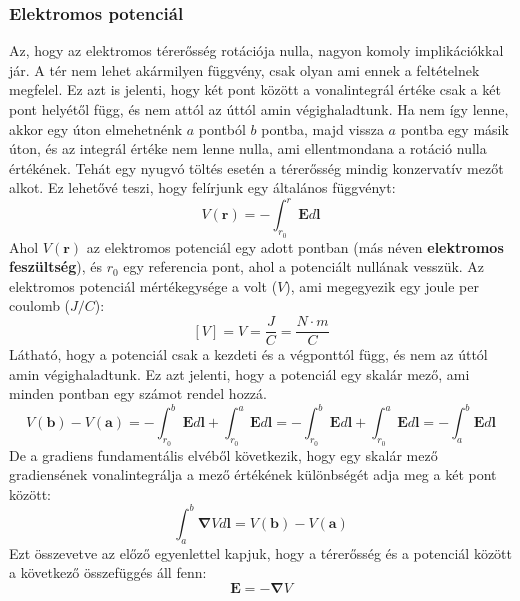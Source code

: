 \documentclass[../main.tex]{subfiles}
\begin{document}
\subsubsection{Elektromos potenciál}
Az, hogy az elektromos térerősség rotációja nulla, nagyon komoly implikációkkal jár. A tér nem lehet akármilyen függvény, csak olyan ami ennek a feltételnek megfelel.
Ez azt is jelenti, hogy két pont között a vonalintegrál értéke csak a két pont helyétől függ, és nem attól az úttól amin végighaladtunk. Ha nem így lenne, akkor egy úton elmehetnénk $a$ pontból $b$ pontba, majd vissza $a$ pontba egy másik úton, és az integrál értéke nem lenne nulla, ami ellentmondana a rotáció nulla értékének.
Tehát egy nyugvó töltés esetén a térerősség mindig konzervatív mezőt alkot. Ez lehetővé teszi, hogy felírjunk egy általános függvényt:
\begin{equation}
    V(\mathbf{r}) = - \int_{r_0}^{r} \mathbf{E} d\mathbf{l}
\end{equation}
Ahol $V(\mathbf{r})$ az elektromos potenciál egy adott pontban (más néven \textbf{elektromos feszültség}), és $r_0$ egy referencia pont, ahol a potenciált nullának vesszük. Az elektromos potenciál mértékegysége a volt ($V$), ami megegyezik egy joule per coulomb ($J/C$):
\begin{equation}
    \left[V\right] = V = \frac{J}{C} = \frac{N \cdot m}{C}
\end{equation}
Látható, hogy a potenciál csak a kezdeti és a végponttól függ, és nem az úttól amin végighaladtunk. Ez azt jelenti, hogy a potenciál egy skalár mező, ami minden pontban egy számot rendel hozzá.
\begin{equation}
    V(\mathbf{b}) - V(\mathbf{a}) = - \int_{r_0}^{b} \mathbf{E} d\mathbf{l} + \int_{r_0}^{a} \mathbf{E} d\mathbf{l} = - \int_{r_0}^{b} \mathbf{E} d\mathbf{l} + \int_{r_0}^{a} \mathbf{E} d\mathbf{l} = - \int_{a}^{b} \mathbf{E} d\mathbf{l} 
\end{equation}
De a gradiens fundamentális elvéből következik, hogy egy skalár mező gradiensének vonalintegrálja a mező értékének különbségét adja meg a két pont között:
\begin{equation}
    \int_{a}^{b} \boldsymbol{\nabla} V d\mathbf{l} = V(\mathbf{b}) - V(\mathbf{a})
\end{equation}
Ezt összevetve az előző egyenlettel kapjuk, hogy a térerősség és a potenciál között a következő összefüggés áll fenn:
\begin{equation}
    \boxed{\mathbf{E} = - \boldsymbol{\nabla} V}
\end{equation}
\end{document}
